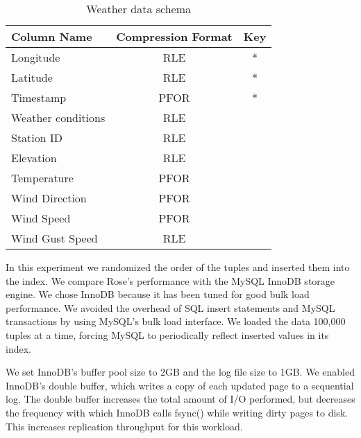 \documentclass{vldb}
\newcommand{\rows}{Rose\xspace}
\newcommand{\rowss}{Rose's\xspace}
\begin{document}
\begin{table}
\caption{Weather data schema}
\centering
\label{tab:schema}
\begin{tabular}{|l|c|c|} \hline
Column Name     & Compression Format &  Key \\ \hline
Longitude       & RLE       & *       \\ \hline
Latitude        & RLE       & *       \\\hline
Timestamp       & PFOR       & *       \\\hline
Weather conditions& RLE       &        \\\hline
Station ID        & RLE       &        \\\hline
Elevation        & RLE       &        \\\hline
Temperature      & PFOR       &        \\\hline
Wind Direction        & PFOR       &        \\\hline
Wind Speed        & PFOR       &        \\\hline
Wind Gust Speed   & RLE       &        \\
\hline\end{tabular}
\end{table}
In this experiment we randomized the order of the tuples and inserted
them into the index.  We compare \rowss performance with the MySQL
InnoDB storage engine.  We chose InnoDB because it has been tuned for
good bulk load performance.  We avoided the overhead of SQL insert
statements and MySQL transactions by using MySQL's bulk load
interface.  We loaded the data 100,000 tuples at a time, forcing
MySQL to periodically reflect inserted values in its index.


We set InnoDB's buffer pool size to 2GB and the log file size to 1GB.
We enabled InnoDB's double buffer, which writes a copy of each updated
page to a sequential log.  The double buffer increases the total amount of
I/O performed, but decreases the frequency with
which InnoDB calls fsync() while writing dirty pages to disk.  This
increases replication throughput for this workload.
\end{document}
